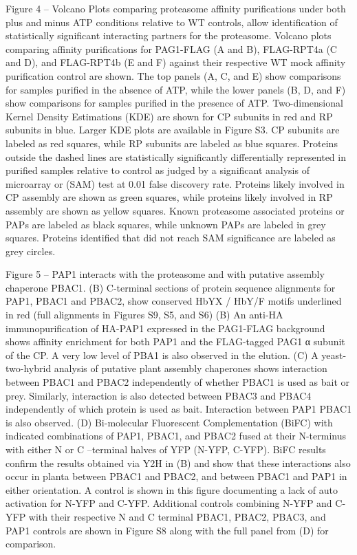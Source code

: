 Figure 4 – Volcano Plots comparing proteasome affinity purifications under both plus and minus ATP conditions relative to WT controls, allow identification of statistically significant interacting partners for the proteasome. Volcano plots comparing affinity purifications for PAG1-FLAG (A and B), FLAG-RPT4a (C and D), and FLAG-RPT4b (E and F) against their respective WT mock affinity purification control are shown. The top panels (A, C, and E) show comparisons for samples purified in the absence of ATP, while the lower panels (B, D, and F) show comparisons for samples purified in the presence of ATP. Two-dimensional Kernel Density Estimations (KDE) are shown for CP subunits in red and RP subunits in blue. Larger KDE plots are available in Figure S3. CP subunits are labeled as red squares, while RP subunits are labeled as blue squares. Proteins outside the dashed lines are statistically significantly differentially represented in purified samples relative to control as judged by a significant analysis of microarray or (SAM) test at 0.01 false discovery rate. Proteins likely involved in CP assembly are shown as green squares, while proteins likely involved in RP assembly are shown as yellow squares. Known proteasome associated proteins or PAPs are labeled as black squares, while unknown PAPs are labeled in grey squares. Proteins identified that did not reach SAM significance are labeled as grey circles.

Figure 5 – PAP1 interacts with the proteasome and with putative assembly chaperone PBAC1. (B) C-terminal sections of protein sequence alignments for PAP1, PBAC1 and PBAC2, show conserved HbYX / HbY/F motifs underlined in red (full alignments in Figures S9, S5, and S6) (B) An anti-HA immunopurification of HA-PAP1 expressed in the PAG1-FLAG background shows affinity enrichment for both PAP1 and the FLAG-tagged PAG1 α subunit of the CP. A very low level of PBA1 is also observed in the elution. (C) A yeast-two-hybrid analysis of putative plant assembly chaperones shows interaction between PBAC1 and PBAC2 independently of whether PBAC1 is used as bait or prey. Similarly, interaction is also detected between PBAC3 and PBAC4 independently of which protein is used as bait. Interaction between PAP1 PBAC1 is also observed. (D) Bi-molecular Fluorescent Complementation (BiFC) with indicated combinations of PAP1, PBAC1, and PBAC2 fused at their N-terminus with either N or C –terminal halves of YFP (N-YFP, C-YFP). BiFC results confirm the results obtained via Y2H in (B) and show that these interactions also occur in planta between PBAC1 and PBAC2, and between PBAC1 and PAP1 in either orientation. A control is shown in this figure documenting a lack of auto activation for N-YFP and C-YFP. Additional controls combining N-YFP and C-YFP with their respective N and C terminal PBAC1, PBAC2, PBAC3, and PAP1 controls are shown in Figure S8 along with the full panel from (D) for comparison.

